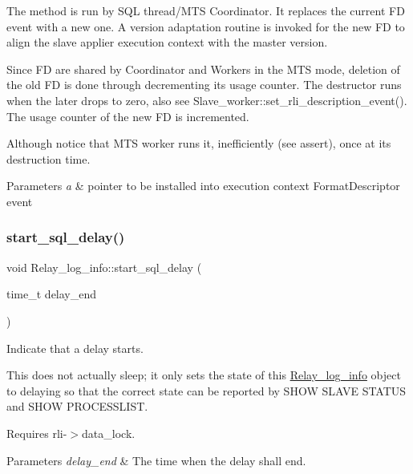 The method is run by S\+QL thread/\+M\+TS Coordinator. It replaces the current FD event with a new one. A version adaptation routine is invoked for the new FD to align the slave applier execution context with the master version.

Since FD are shared by Coordinator and Workers in the M\+TS mode, deletion of the old FD is done through decrementing its usage counter. The destructor runs when the later drops to zero, also see {\ttfamily Slave\+\_\+worker\+::set\+\_\+rli\+\_\+description\+\_\+event()}. The usage counter of the new FD is incremented.

Although notice that M\+TS worker runs it, inefficiently (see assert), once at its destruction time.


\begin{DoxyParams}{Parameters}
{\em a} & pointer to be installed into execution context Format\+Descriptor event \\
\hline
\end{DoxyParams}
\mbox{\label{classRelay__log__info_a6296341e5cd0f5fe19b20af5edb842f4}} 
\subsubsection{\texorpdfstring{start\+\_\+sql\+\_\+delay()}{start\_sql\_delay()}}
{\footnotesize\ttfamily void Relay\+\_\+log\+\_\+info\+::start\+\_\+sql\+\_\+delay (\begin{DoxyParamCaption}\item[{time\+\_\+t}]{delay\+\_\+end }\end{DoxyParamCaption})\hspace{0.3cm}{\ttfamily [inline]}}

Indicate that a delay starts.

This does not actually sleep; it only sets the state of this \mbox{\hyperlink{classRelay__log__info}{Relay\+\_\+log\+\_\+info}} object to delaying so that the correct state can be reported by S\+H\+OW S\+L\+A\+VE S\+T\+A\+T\+US and S\+H\+OW P\+R\+O\+C\+E\+S\+S\+L\+I\+ST.

Requires rli-\/$>$data\+\_\+lock.


\begin{DoxyParams}{Parameters}
{\em delay\+\_\+end} & The time when the delay shall end. \\
\hline
\end{DoxyParams}
\mbox{\label{classRelay__log__info_a0e802ae911c2cda3436b8e8f4c3d9468}} 
